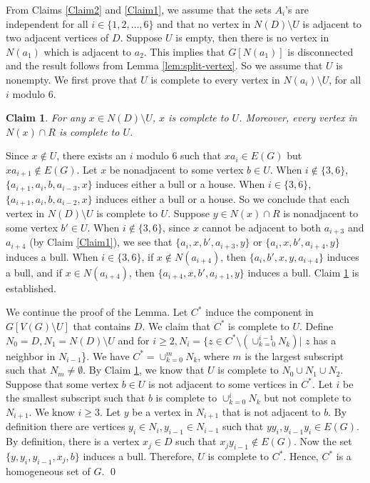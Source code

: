 \documentclass[a4paper,11pt]{article}
\newtheorem{claim}[theorem]{Claim}
\theoremstyle{case}
\begin{document}
\vspace{8pt}
\noindent
    From Claims \ref{Claim2} and \ref{Claim1}, we assume that the sets $A_i$'s are independent for all $i\in \{1,2,\ldots,6\}$ and that no vertex in $N(D)\setminus U$ is adjacent to two adjacent vertices of $D$. Suppose $U$ is empty, then there is no vertex in $N(a_1)$ which is adjacent to $a_2$. This implies that $G[N(a_1)]$ is disconnected and the result follows from Lemma \ref{lem:split-vertex}. So we assume that $U$ is nonempty. We first prove that $U$ is complete to every vertex in $N(a_i)\setminus U$, for all $i$ modulo 6.



\begin{claim}\label{Claim3}
        For any $x\in N(D)\setminus U$, $x$ is complete to $U$. Moreover, every vertex in $N(x)\cap R$ is complete to $U$.
\end{claim}

Since $x\notin U$, there exists an $i$ modulo $6$ such that $xa_i\in E(G)$ but $xa_{i+1}\notin E(G)$. Let $x$ be nonadjacent to some vertex $b\in U$. When $i\notin \{3,6\}$, $\{a_{i+1}, a_i, b,a_{i-3}, x\}$ induces either a bull or a house. When $i\in \{3,6\}$, $\{a_{i+1}, a_i, b,a_{i-2}, x\}$ induces either a bull or a house. So we conclude that each vertex in $N(D)\setminus U$ is complete to $U$. Suppose $y\in N(x)\cap R$ is nonadjacent to some vertex $b'\in U$. When $i\notin \{3,6\}$, since $x$ cannot be adjacent to both $a_{i+3}$ and $a_{i+4}$ (by Claim \ref{Claim1}), we see that $\{a_{i}, x,  b', a_{i+3}, y\}$ or $\{a_{i}, x,  b', a_{i+4}, y\}$ induces a bull. When $i\in \{3,6\}$, if $x \notin N(a_{i+4})$, then $\{a_i, b', x,y, a_{i+4}\}$ induces a bull, and if $x\in N(a_{i+4})$, then $\{a_{i+4},x, b',a_{i+1}, y\}$ induces a bull.  
Claim \ref{Claim3} is established. 

We continue the proof of the Lemma. 
Let $C^{*}$ induce the component in $G[V(G)\setminus U]$ that contains $D$. We claim that $C^{*}$ is complete to $U$. 
Define $N_0 = D, N_1 = N(D) \setminus U$ and for $i \geq 2, N_i = \{ z \in C^* \setminus (\cup_{k = 0}^{i-1} N_k )|$ $z$ has a neighbor in $N_{i-1}$\}. We have $C^* = \cup_{k = 0}^{m} N_k$, where $m$ is the largest subscript such that $N_m \not= \emptyset$. By Claim \ref{Claim3}, we know that $U$ is complete to $N_0 \cup N_1 \cup N_2$. Suppose that some vertex $b \in U$ is not adjacent to some vertices in $C^*$. Let $i$ be the smallest subscript such that $b$ is complete to $\cup_{k = 0}^{i} N_k$ but not complete to $N_{i+1}$. We know $i \geq 3$. Let $y$ be a vertex in $N_{i+1}$ that is not adjacent to $b$. By definition there are vertices $y_i \in N_i, y_{i-1} \in N_{i-1}$ such that $y y_{i}, y_{i-1} y_{i} \in E(G)$. By definition, there is a vertex $x_j \in D$ such that $x_j y_{i-1} \not\in E(G)$. Now the set $\{y, y_i, y_{i-1}, x_j, b\}$ induces a bull.
Therefore, $U$ is complete to $C^{*}$. Hence, $C^{*}$ is a homogeneous set of $G$. \qed
\end{document}
